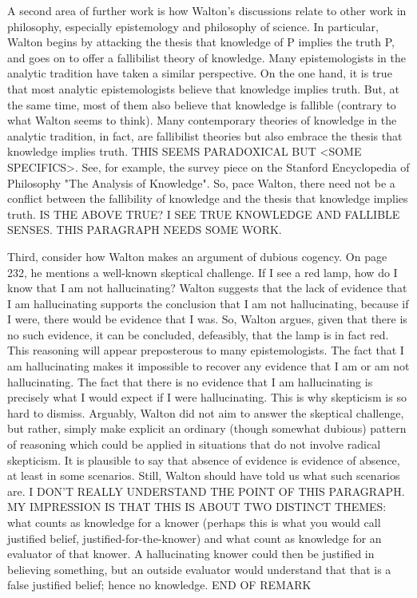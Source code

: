 \documentclass[12pt]{article}
\begin{document}
A second area of further work is how Walton's discussions relate to other work in philosophy, especially epistemology and philosophy of science. In particular, Walton begins by attacking the thesis that knowledge of P implies
the truth P, and goes on to offer a fallibilist theory of
knowledge. Many  epistemologists in the analytic tradition have taken a similar perspective. On the one hand, it is true that most analytic
epistemologists believe that knowledge implies truth. But, at the same
time, most of them also believe that knowledge is fallible (contrary
to what Walton seems to think). Many contemporary theories of
knowledge in the analytic tradition, in fact, are fallibilist theories
but also embrace the thesis that knowledge implies truth. THIS SEEMS PARADOXICAL BUT <SOME SPECIFICS>. See, for
example, the survey piece on the Stanford Encyclopedia of Philosophy
"The Analysis of Knowledge". So, pace Walton, there need not be a
conflict between the fallibility of knowledge and the thesis that
knowledge implies truth. 
IS THE ABOVE TRUE? I SEE TRUE KNOWLEDGE AND FALLIBLE SENSES. THIS PARAGRAPH NEEDS SOME WORK.

Third, consider how Walton makes an argument of dubious cogency. On
page 232, he mentions a well-known skeptical challenge. If I see a red
lamp, how do I know that I am not hallucinating? Walton suggests that
the lack of evidence that I am hallucinating supports the conclusion
that I am not hallucinating, because if I were, there would be
evidence that I was. So, Walton argues, given that there is no such
evidence, it can be concluded, defeasibly, that the lamp is in fact
red. This reasoning will appear preposterous to many epistemologists.
The fact that I am hallucinating makes it impossible to recover any
evidence that I am or am not hallucinating. The fact that there is no
evidence that I am hallucinating is precisely what I would expect if I
were hallucinating. This is why skepticism is so hard to dismiss.
Arguably, Walton did not aim to answer the skeptical challenge, but
rather, simply make explicit an ordinary (though somewhat dubious)
pattern of reasoning which could be applied in situations that do not
involve radical skepticism. It is plausible to say that absence of
evidence is evidence of absence, at least in some scenarios. Still,
Walton should have told us what such scenarios are.
I DON'T REALLY UNDERSTAND THE POINT OF THIS PARAGRAPH. MY IMPRESSION IS THAT THIS IS ABOUT TWO DISTINCT THEMES: what counts as knowledge for a knower (perhaps this is what you would call justified belief, justified-for-the-knower) and what count as knowledge for an evaluator of that knower. A hallucinating knower could then be justified in believing something, but an outside evaluator would understand that that is a false justified belief; hence no knowledge. END OF REMARK
\end{document}
